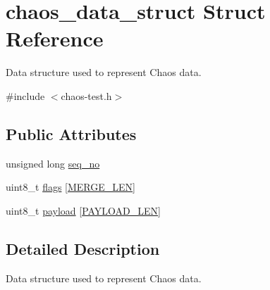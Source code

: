 \hypertarget{structchaos__data__struct}{\section{chaos\-\_\-data\-\_\-struct Struct Reference}
\label{structchaos__data__struct}
}


Data structure used to represent Chaos data.  




{\ttfamily \#include $<$chaos-\/test.\-h$>$}

\subsection*{Public Attributes}
\begin{DoxyCompactItemize}
\item 
unsigned long \hyperlink{structchaos__data__struct_acefe9b2cac2bc7d3a0b40053d55ae879}{seq\-\_\-no}
\item 
uint8\-\_\-t \hyperlink{structchaos__data__struct_ac14c70edc5a438f0e5d3d2949ec363d0}{flags} \mbox{[}\hyperlink{group__chaos-test-settings_ga866587a856ba94fe36129ce80986c2c9}{M\-E\-R\-G\-E\-\_\-\-L\-E\-N}\mbox{]}
\item 
uint8\-\_\-t \hyperlink{structchaos__data__struct_ac64d81244298d24bfdf17123697d7fe7}{payload} \mbox{[}\hyperlink{group__chaos-test-settings_ga212a14606599edd2c69298c5cffa64a0}{P\-A\-Y\-L\-O\-A\-D\-\_\-\-L\-E\-N}\mbox{]}
\end{DoxyCompactItemize}


\subsection{Detailed Description}
Data structure used to represent Chaos data. 

